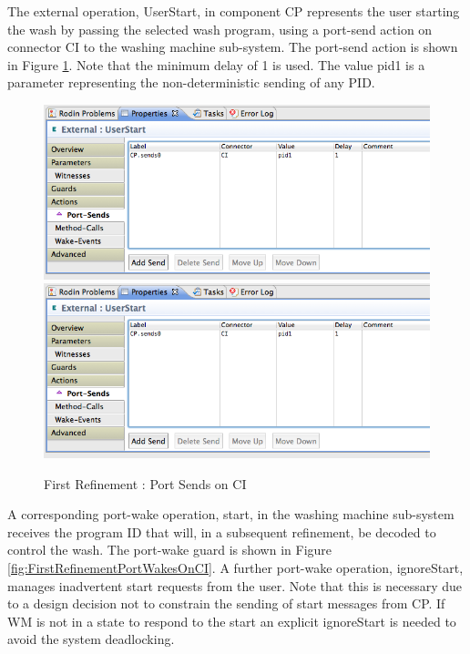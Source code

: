 The external operation, UserStart, in component CP represents the user starting the wash by passing the selected wash program, using a port-send action on connector CI to the washing machine sub-system. The port-send action is shown in Figure \ref{fig: FirstRefinementPortSendsOnCI}. Note that the minimum delay of 1 is used. The value pid1 is a parameter representing the non-deterministic sending of any PID.
 
 \begin{figure}[!htbp]
  \centering
  \ifplastex
  \includegraphics[width=1024]{figures/image20.png}
  \else
  \includegraphics[width=1\textwidth]{figures/image20.png}
  \fi
  \caption{First Refinement : Port Sends on CI}
  \label{fig: FirstRefinementPortSendsOnCI}
\end{figure} 

A corresponding port-wake operation, start, in the washing machine sub-system receives the program ID that will, in a subsequent refinement, be decoded to control the wash. The port-wake guard is shown in Figure \ref{fig:FirstRefinementPortWakesOnCI}. 
A further port-wake operation, ignoreStart, manages inadvertent start requests from the user. Note that this is necessary due to a design decision not to constrain the sending of start messages from CP. If WM is not in a state to respond to the start an explicit ignoreStart is needed to avoid the system deadlocking.
 

